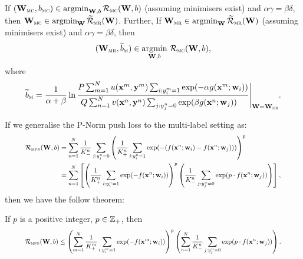 \begin{theorem}
\label{theorem:mc2mr}
If $(\mathbf{W}_\textsc{mc}, b_\textsc{mc}) \in \operatorname*{argmin}_{\mathbf{W},b} \mathcal{R}_\textsc{mc}(\mathbf{W}, b)$ (assuming minimisers exist)
and $\alpha \gamma = \beta \delta$, then $\mathbf{W}_\textsc{mc} \in \operatorname*{argmin}_{\mathbf{W}} \widetilde{\mathcal{R}}_\textsc{mr}(\mathbf{W})$.
Further, If $\mathbf{W}_\textsc{mr} \in \operatorname*{argmin}_{\mathbf{W}} \widetilde{\mathcal{R}}_\textsc{mr}(\mathbf{W})$ (assuming minimisers exist) and $\alpha \gamma = \beta \delta$,
then 
$$
(\mathbf{W}_\textsc{mr}, \widetilde{b}_\textsc{m}) \in \operatorname*{argmin}_{\mathbf{W},b} \, \mathcal{R}_\textsc{mc}(\mathbf{W}, b),
$$ 
where
\begin{equation*}
\resizebox{.9\linewidth}{!}{$
\displaystyle
\bt_\textsc{m} = \frac{1}{\alpha + \beta} \ln 
      \frac{P \sum_{m=1}^N u(\x^m, \y^m) \sum_{i: y_i^m = 1} \exp(-\alpha g(\x^m; \w_i))}
           {Q \sum_{n=1}^N v(\x^n, \y^n) \sum_{j: y_j^n = 0} \exp( \beta  g(\x^n; \w_j)) \hspace{1em}} \Bigg|_{\W = \W_\textsc{mr}}.
$}
\end{equation*}
\end{theorem}


If we generalise the P-Norm push loss to the multi-label setting as:
\begin{equation}
\label{eq:pnorm-ml}
\resizebox{.9\linewidth}{!}{$
\displaystyle
\begin{aligned}
\RCal_\textsc{mpn}(\W, b) 
&= \sum_{n=1}^N \frac{1}{K_-^n} \sum_{j:y_j^n=0} \left( \frac{1}{K_+^n} \sum_{i:y_i^n=1} \exp(-(f(\x^n; \w_i) - f(\x^n; \w_j))) \right)^p \\
&= \sum_{n=1}^N \left[
   \left( \frac{1}{K_+^n} \sum_{i:y_i^n=1} \exp(-f(\x^n; \w_i)) \right)^p 
   \left( \frac{1}{K_-^n} \sum_{j:y_j^n=0} \exp(p \cdot f(\x^n; \w_j)) \right) \right],
\end{aligned}
$}
\end{equation}
then we have the follow theorem:
\begin{theorem}
\label{theorem:pnorm-ml-ub}
If $p$ is a positive integer, \ie $p \in \mathbb{Z}_+$, then 
\begin{equation}
\label{eq:pnorm-ml-ub}
\resizebox{.9\linewidth}{!}{$
\displaystyle
\RCal_\textsc{mpn}(\W, b) \le 
\left( \sum_{m=1}^N \frac{1}{K_+^m} \sum_{i:y_i^m=1} \exp(-f(\x^m; \w_i)) \right)^p 
\left( \sum_{n=1}^N \frac{1}{K_-^n} \sum_{j:y_j^n=0} \exp(p \cdot f(\x^n; \w_j)) \right).
$}
\end{equation}
\end{theorem}

